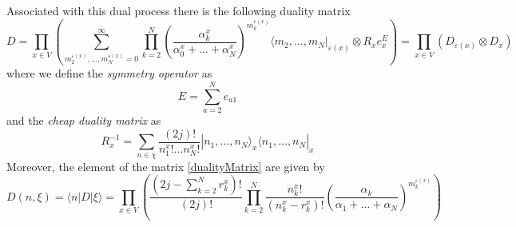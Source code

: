 \documentclass[11pt]{article}
\numberwithin{equation}{subsection}
\begin{document}
Associated with this dual process there is the following duality matrix 
\begin{equation}\label{dualityMatrix}
	D=\prod_{x\in V}\left(\sum_{m_{2}^{\varepsilon(x)},\ldots,m_{N}^{\varepsilon(x)}=0}^{\infty}\prod_{k=2}^{N}\left(\frac{\alpha_{k}^{x}}{\alpha_{0}^{x}+\ldots+\alpha_{N}^{x}}\right)^{m_{k}^{\varepsilon(x)}}\langle m_{2},\ldots,m_{N}|_{\varepsilon(x)}\otimes R_{x}e^{E}_{x} \right)
	=\prod_{x\in V}\left(D_{\varepsilon(x)}\otimes D_{x}\right)
\end{equation}
where we define the \textit{symmetry operator} as
\begin{equation}\label{e_def}
	E=\sum_{a=2}^{N}e_{a1}
\end{equation}
and the \textit{cheap duality matrix} as 
\begin{equation}
	R^{-1}_{x}=\sum_{n\in \chi}\frac{(2j)!}{n_{1}^{x}!\ldots n_{N}^{x}!}|n_{1},\ldots,n_{N}\rangle_{x}\langle n_{1},\ldots,n_{N}|_{x}%
\end{equation}
Moreover, the element of the matrix \eqref{dualityMatrix} are given by
\begin{equation}\label{dualityElements}
	D(n,\xi)=\langle n|D|\xi\rangle=\prod_{x\in V}\left(\frac{(2j-\sum_{k=2}^{N}r_{k}^{x})!}{(2j)!}\prod_{k=2}^{N}\frac{n_{k}^{x}!}{(n_{k}^{x}-r_{k}^{x})!}\left(\frac{\alpha_{k}}{\alpha_{1}+\ldots+\alpha_{N}}\right)^{m_{k}^{\varepsilon(x)}}\right)
\end{equation}
\end{document}
